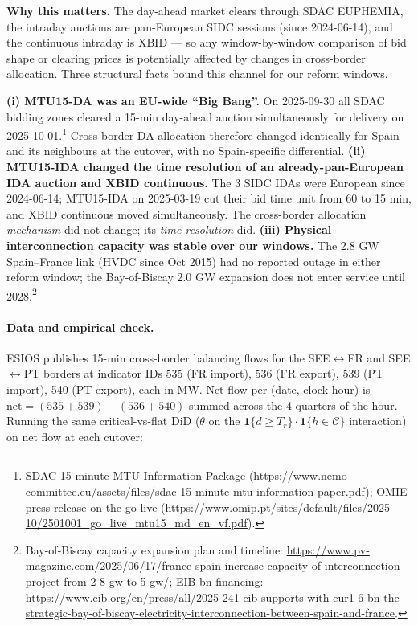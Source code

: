 \documentclass[11pt,a4paper]{article}
\begin{document}
\noindent\textbf{Why this matters.} The day-ahead market clears through SDAC EUPHEMIA, the intraday auctions are pan-European SIDC sessions (since 2024-06-14), and the continuous intraday is XBID --- so any window-by-window comparison of bid shape or clearing prices is potentially affected by changes in cross-border allocation. Three structural facts bound this channel for our reform windows.

\textbf{(i) MTU15-DA was an EU-wide ``Big Bang''.} On 2025-09-30 all SDAC bidding zones cleared a 15-min day-ahead auction simultaneously for delivery on 2025-10-01.\footnote{SDAC 15-minute MTU Information Package (\url{https://www.nemo-committee.eu/assets/files/sdac-15-minute-mtu-information-paper.pdf}); OMIE press release on the go-live (\url{https://www.omip.pt/sites/default/files/2025-10/2501001_go_live_mtu15_md_en_vf.pdf}).} Cross-border DA allocation therefore changed identically for Spain and its neighbours at the cutover, with no Spain-specific differential. \textbf{(ii) MTU15-IDA changed the time resolution of an already-pan-European IDA auction and XBID continuous.} The 3 SIDC IDAs were European since 2024-06-14; MTU15-IDA on 2025-03-19 cut their bid time unit from 60 to 15 min, and XBID continuous moved simultaneously. The cross-border allocation \emph{mechanism} did not change; its \emph{time resolution} did. \textbf{(iii) Physical interconnection capacity was stable over our windows.} The 2.8 GW Spain--France link (HVDC since Oct 2015) had no reported outage in either reform window; the Bay-of-Biscay 2.0 GW expansion does not enter service until 2028.\footnote{Bay-of-Biscay capacity expansion plan and timeline: \url{https://www.pv-magazine.com/2025/06/17/france-spain-increase-capacity-of-interconnection-project-from-2-8-gw-to-5-gw/}; EIB  bn financing: \url{https://www.eib.org/en/press/all/2025-241-eib-supports-with-eur1-6-bn-the-strategic-bay-of-biscay-electricity-interconnection-between-spain-and-france}.}

\paragraph{Data and empirical check.} ESIOS publishes 15-min cross-border balancing flows for the SEE$\leftrightarrow$FR and SEE$\leftrightarrow$PT borders at indicator IDs 535 (FR import), 536 (FR export), 539 (PT import), 540 (PT export), each in MW. Net flow per (date, clock-hour) is $\text{net}=(535+539)-(536+540)$ summed across the 4 quarters of the hour. Running the same critical-vs-flat DiD ($\theta$ on the $\mathbf{1}\{d\ge T_r\}\!\cdot\!\mathbf{1}\{h\in\mathcal{C}\}$ interaction) on net flow at each cutover:
\end{document}
